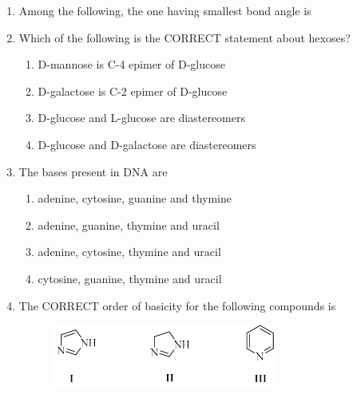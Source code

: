 \documentclass[journal,12pt,onecolumn]{IEEEtran}
\theoremstyle{remark}
\begin{document}
\begin{enumerate}
    \item Among the following, the one having smallest bond angle is

    \hfill{}
    \begin{enumerate}
    \end{enumerate}

    \item Which of the following is the CORRECT statement about hexoses?

    \hfill{}
    \begin{enumerate}
        \item D-mannose is C-4 epimer of D-glucose
        \item D-galactose is C-2 epimer of D-glucose
        \item D-glucose and L-glucose are diastereomers
        \item D-glucose and D-galactose are diastereomers
    \end{enumerate}

    \item The bases present in DNA are

    \hfill{}
    \begin{enumerate}
        \item adenine, cytosine, guanine and thymine
        \item adenine, guanine, thymine and uracil
        \item adenine, cytosine, thymine and uracil
        \item cytosine, guanine, thymine and uracil
    \end{enumerate}

    \item The CORRECT order of basicity for the following compounds is
    \begin{figure}[h!]
        \centering
        \includegraphics[width=0.5\columnwidth]{fig15.png}
        \caption*{}
        \label{fig:q17}
    \end{figure}


\end{enumerate}
\end{document}
